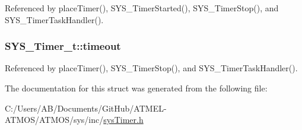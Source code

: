 Referenced by place\-Timer(), S\-Y\-S\-\_\-\-Timer\-Started(), S\-Y\-S\-\_\-\-Timer\-Stop(), and S\-Y\-S\-\_\-\-Timer\-Task\-Handler().

\hypertarget{struct_s_y_s___timer__t_adf83122a4740de04c1029b1e0950ce94}{
\subsubsection[{timeout}]{ S\-Y\-S\-\_\-\-Timer\-\_\-t\-::timeout}}\label{struct_s_y_s___timer__t_adf83122a4740de04c1029b1e0950ce94}


Referenced by place\-Timer(), S\-Y\-S\-\_\-\-Timer\-Stop(), and S\-Y\-S\-\_\-\-Timer\-Task\-Handler().



The documentation for this struct was generated from the following file\-:\begin{DoxyCompactItemize}
\item 
C\-:/\-Users/\-A\-B/\-Documents/\-Git\-Hub/\-A\-T\-M\-E\-L-\/\-A\-T\-M\-O\-S/\-A\-T\-M\-O\-S/sys/inc/\hyperlink{sys_timer_8h}{sys\-Timer.\-h}\end{DoxyCompactItemize}
